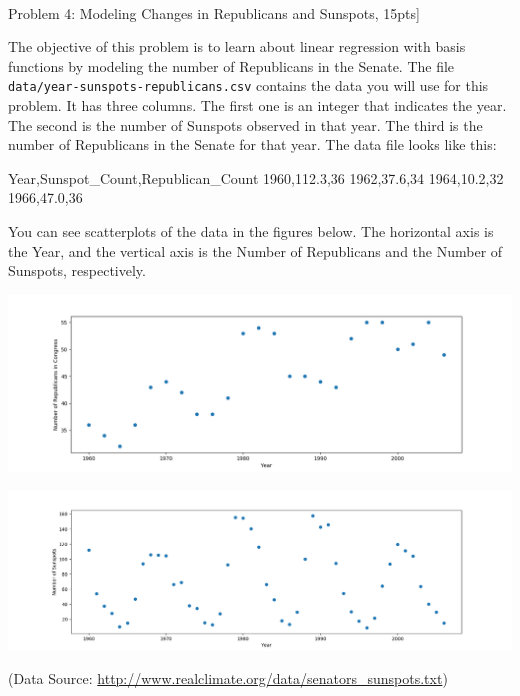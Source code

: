 \documentclass[submit]{harvardml}
\begin{document}
\\

\newpage

Problem 4: Modeling Changes in Republicans and Sunspots, 15pts]
  
 The objective of this problem is to learn about linear regression
 with basis functions by modeling the number of Republicans in the
 Senate. The file \verb|data/year-sunspots-republicans.csv| contains the
 data you will use for this problem.  It has three columns.  The first
 one is an integer that indicates the year.  The second is the number
 of Sunspots observed in that year.  The third is the number of Republicans in the Senate for that year.
 The data file looks like this:
 \begin{csv}
Year,Sunspot_Count,Republican_Count
1960,112.3,36
1962,37.6,34
1964,10.2,32
1966,47.0,36
\end{csv}

You can see scatterplots of the data in the figures below.  The horizontal axis is the Year, and the vertical axis is the Number of Republicans and the Number of Sunspots, respectively.

\begin{center}
\includegraphics[width=.5\textwidth]{data/year-republicans}
\end{center}

\begin{center}
\includegraphics[width=.5\textwidth]{data/year-sunspots}
\end{center}

(Data Source: \url{http://www.realclimate.org/data/senators_sunspots.txt})\\
\vspace{-5mm}
\end{document}
